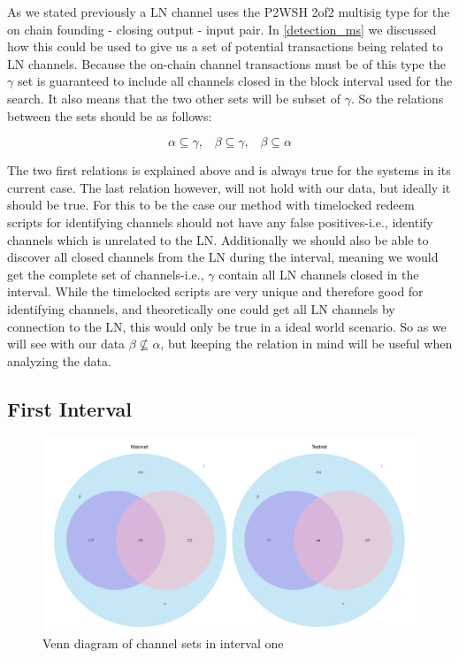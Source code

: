 As we stated previously a LN channel uses the P2WSH 2of2 multisig type for the on chain founding - closing output - input pair. In \cref{detection_ms} we discussed how this could be used to give us a set of potential transactions being related to LN channels. Because the on-chain channel transactions must be of this type the \( \gamma \) set is guaranteed to include all channels closed in the block interval used for the search. It also means that the two other sets will be subset of \( \gamma \). So the relations between the sets should be as follows:

\begin{equation} \label{eq:1}
      \alpha \subseteq \gamma, \hspace{10pt} \beta \subseteq \gamma, \hspace{10pt} \beta \subseteq \alpha  
\end{equation}

The two first relations is explained above and is always true for the systems in its current case. The last relation however, will not hold with our data, but ideally it should be true. For this to be the case our method with timelocked redeem scripts for identifying channels should not have any false positives-i.e., identify channels which is unrelated to the LN. Additionally we should also be able to discover all closed channels from the LN during the interval, meaning we would get the complete set of channels-i.e., \( \gamma \) contain all LN channels closed in the interval. While the timelocked scripts are very unique and therefore good for identifying channels, and theoretically one could get all LN channels by connection to the LN, this would only be true in a ideal world scenario. So as we will see with our data \( \beta \not\subseteq \alpha \), but keeping the relation in mind will be useful when analyzing the data.

\subsection{First Interval}

\begin{figure}[h]
    \centering
    \includegraphics[width=16cm]{figures/graphs/venn_full1.png}
    \caption{Venn diagram of channel sets in interval one}
    \label{fig:venn_run1}
\end{figure}

